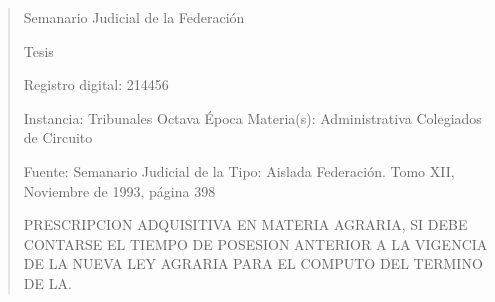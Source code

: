 \documentclass[11pt,a4paper]{article}
\begin{document}
\begin{quote}
                                                   Semanario Judicial de la Federación

                                                  Tesis

 Registro digital: 214456

 Instancia: Tribunales            Octava Época                         Materia(s): Administrativa
 Colegiados de Circuito

                                  Fuente: Semanario Judicial de la     Tipo: Aislada
                                  Federación.
                                  Tomo XII, Noviembre de 1993,
                                  página 398


PRESCRIPCION ADQUISITIVA EN MATERIA AGRARIA, SI DEBE CONTARSE EL TIEMPO DE
POSESION ANTERIOR A LA VIGENCIA DE LA NUEVA LEY AGRARIA PARA EL COMPUTO DEL
TERMINO DE LA.



\end{quote}
\end{document}
